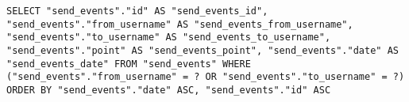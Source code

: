 \documentclass[../../../../../../main]{subfiles}
\begin{document}
    \begin{mdframed}
        \begin{verbatim}
SELECT "send_events"."id" AS "send_events_id", "send_events"."from_username" AS "send_events_from_username", "send_events"."to_username" AS "send_events_to_username", "send_events"."point" AS "send_events_point", "send_events"."date" AS "send_events_date" FROM "send_events" WHERE ("send_events"."from_username" = ? OR "send_events"."to_username" = ?) ORDER BY "send_events"."date" ASC, "send_events"."id" ASC
        \end{verbatim}
    \end{mdframed}
    \label{fig:streaming-query}
\end{document}
